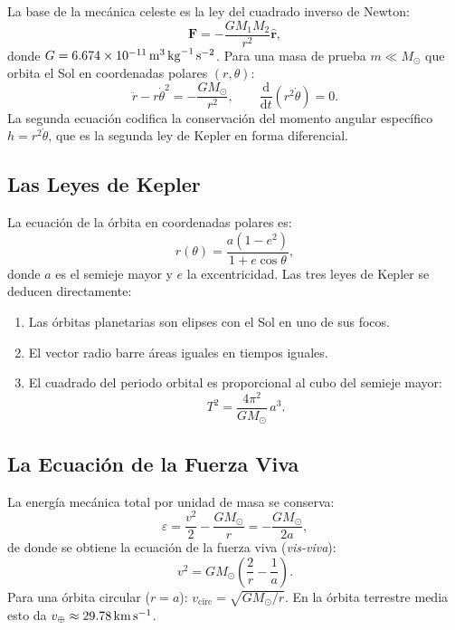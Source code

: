 \documentclass[12pt,a4paper]{article}
\newcommand{\dd}{\mathrm{d}}
\begin{document}
La base de la mecánica celeste es la ley del cuadrado inverso de Newton:
\begin{equation}
  \bm{F} = -\frac{GM_1 M_2}{r^2}\hat{\bm{r}},
  \label{eq:newton_es}
\end{equation}
donde $G = \SI{6{,}674e-11}{\meter\cubed\per\kilo\gram\per\second\squared}$.
Para una masa de prueba $m \ll M_\odot$ que orbita el Sol en coordenadas
polares $(r,\theta)$:
\begin{equation}
  \ddot{r} - r\dot{\theta}^2 = -\frac{GM_\odot}{r^2}, \qquad
  \frac{\dd}{\dd t}(r^2\dot{\theta}) = 0.
\end{equation}
La segunda ecuación codifica la conservación del momento angular específico
$h = r^2\dot{\theta}$, que es la segunda ley de Kepler en forma diferencial.

\subsection{Las Leyes de Kepler}

La ecuación de la órbita en coordenadas polares es:
\begin{equation}
  r(\theta) = \frac{a(1-e^2)}{1 + e\cos\theta},
\end{equation}
donde $a$ es el semieje mayor y $e$ la excentricidad. Las tres leyes de
Kepler se deducen directamente:
\begin{enumerate}[label=\textbf{K\arabic*.}]
  \item Las órbitas planetarias son elipses con el Sol en uno de sus focos.
  \item El vector radio barre áreas iguales en tiempos iguales.
  \item El cuadrado del periodo orbital es proporcional al cubo del semieje mayor:
    \begin{equation}
      T^2 = \frac{4\pi^2}{GM_\odot}\,a^3.
      \label{eq:kepler3_es}
    \end{equation}
\end{enumerate}

\subsection{La Ecuación de la Fuerza Viva}

La energía mecánica total por unidad de masa se conserva:
\begin{equation}
  \varepsilon = \frac{v^2}{2} - \frac{GM_\odot}{r} = -\frac{GM_\odot}{2a},
\end{equation}
de donde se obtiene la ecuación de la fuerza viva (\textit{vis-viva}):
\begin{equation}
  \boxed{v^2 = GM_\odot\!\left(\frac{2}{r} - \frac{1}{a}\right).}
  \label{eq:visviva_es}
\end{equation}
Para una órbita circular ($r = a$): $v_{\mathrm{circ}} = \sqrt{GM_\odot/r}$.
En la órbita terrestre media esto da $v_\oplus \approx \SI{29{,}78}{\kilo\meter\per\second}$.
\end{document}
